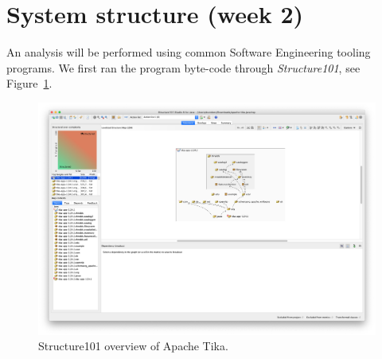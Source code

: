 \documentclass{article}
\begin{document}


\section{System structure (week 2)}
An analysis will be performed using common Software Engineering tooling programs. We first ran the program byte-code through \textit{Structure101}, see Figure~\ref{fig:structure101}.

\begin{figure}
    \centering
    \includegraphics[width=\textwidth]{images/structure101.png}
    \caption{Structure101 overview of Apache Tika.}
    \label{fig:structure101}
\end{figure}
\end{document}
